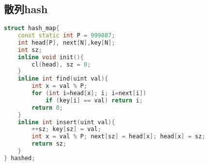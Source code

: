 \subsection{散列hash}
		\begin{lstlisting}[language=c++]
struct hash_map{
	const static int P = 999887;
	int head[P], next[N],key[N];
	int sz;
	inline void init(){
		cl(head), sz = 0;
	}
	inline int find(uint val){
		int x = val % P;
		for (int i=head[x]; i; i=next[i])
			if (key[i] == val) return i;
		return 0;
	}
	inline int insert(uint val){
		++sz; key[sz] = val;
		int x = val % P; next[sz] = head[x]; head[x] = sz;
		return sz;
	}
} hashed;
		\end{lstlisting}
